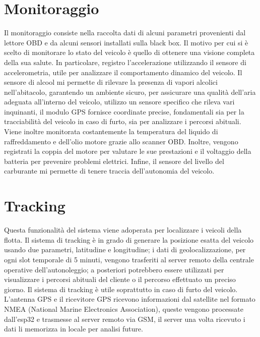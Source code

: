 \documentclass[12pt, a4paper, italian]{report}
\numberwithin{figure}{chapter}
\numberwithin{table}{chapter}
\begin{document}
\section{Monitoraggio}
Il monitoraggio consiste nella raccolta dati di alcuni parametri provenienti dal lettore OBD e da alcuni sensori installati sulla black box. 
Il motivo per cui si è scelto di monitorare lo stato del veicolo è quello di ottenere una visione completa della sua salute. In particolare, registro l'accelerazione utilizzando il sensore di accelerometria, utile per analizzare il comportamento dinamico del veicolo. Il sensore di alcool mi permette di rilevare la presenza di vapori alcolici nell'abitacolo, garantendo un ambiente sicuro, per assicurare una qualità dell'aria adeguata all'interno del veicolo, utilizzo un sensore specifico che rileva vari inquinanti, il modulo GPS fornisce coordinate precise, fondamentali sia per la tracciabilità del veicolo in caso di furto, sia per analizzare i percorsi abituali. Viene inoltre monitorata  costantemente la temperatura del liquido di raffreddamento e dell'olio motore grazie allo scanner OBD. Inoltre, vengono registrati la coppia del motore per valutare le sue prestazioni e il voltaggio della batteria per prevenire problemi elettrici.
Infine, il sensore del livello del carburante mi permette di tenere traccia dell'autonomia del veicolo. 
\section{Tracking}
Questa funzionalità del sistema viene adoperata per localizzare i veicoli della flotta. Il sistema di tracking è in grado di generare la posizione esatta del veicolo usando due parametri, latitudine e longitudine; i dati di geolocalizzazione, per ogni slot temporale di 5 minuti, vengono trasferiti al server remoto della centrale operative dell'autonoleggio; a posteriori potrebbero essere utilizzati per visualizzare i percorsi abituali del cliente o il percorso effettuato un preciso giorno. Il sistema di tracking è utile soprattutto in caso di furto del veicolo.
L'antenna GPS e il ricevitore GPS ricevono informazioni dal satellite nel formato NMEA (National Marine Electronics Association), queste vengono processate dall'esp32 e trasmesse al server remoto via GSM, il server una volta ricevuto i dati li memorizza in locale per analisi future. 
\end{document}

